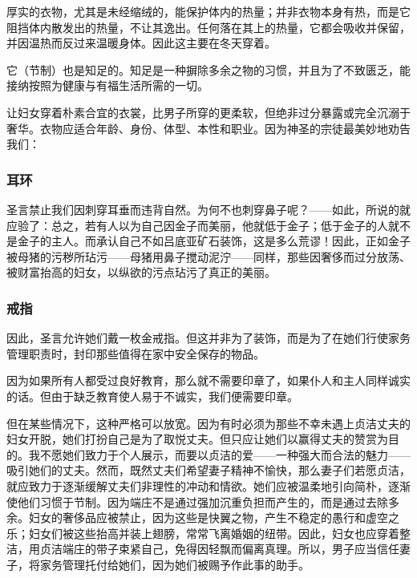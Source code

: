 厚实的衣物，尤其是未经缩绒的，能保护体内的热量；并非衣物本身有热，而是它阻挡体内散发出的热量，不让其逸出。任何落在其上的热量，它都会吸收并保留，并因温热而反过来温暖身体。因此这主要在冬天穿着。\par

它（节制）也是知足的。知足是一种摒除多余之物的习惯，并且为了不致匮乏，能接纳按照为健康与有福生活所需的一切。\par

让妇女穿着朴素合宜的衣裳，比男子所穿的更柔软，但绝非过分暴露或完全沉溺于奢华。衣物应适合年龄、身份、体型、本性和职业。因为神圣的宗徒最美妙地劝告我们：\par


\subsubsection{耳环}

圣言禁止我们因刺穿耳垂而违背自然。为何不也刺穿鼻子呢？——如此，所说的就应验了：总之，若有人以为自己因金子而美丽，他就低于金子；低于金子的人就不是金子的主人。而承认自己不如吕底亚矿石装饰，这是多么荒谬！因此，正如金子被母猪的污秽所玷污——母猪用鼻子搅动泥泞——同样，那些因奢侈而过分放荡、被财富抬高的妇女，以纵欲的污点玷污了真正的美丽。\par


\subsubsection{戒指}

因此，圣言允许她们戴一枚金戒指。但这并非为了装饰，而是为了在她们行使家务管理职责时，封印那些值得在家中安全保存的物品。\par

因为如果所有人都受过良好教育，那么就不需要印章了，如果仆人和主人同样诚实的话。但由于缺乏教育使人易于不诚实，我们便需要印章。\par

但在某些情况下，这种严格可以放宽。因为有时必须为那些不幸未遇上贞洁丈夫的妇女开脱，她们打扮自己是为了取悦丈夫。但只应让她们以赢得丈夫的赞赏为目的。我不愿她们致力于个人展示，而要以贞洁的爱——一种强大而合法的魅力——吸引她们的丈夫。然而，既然丈夫们希望妻子精神不愉快，那么妻子们若愿贞洁，就应致力于逐渐缓解丈夫们非理性的冲动和情欲。她们应被温柔地引向简朴，逐渐使他们习惯于节制。因为端庄不是通过强加沉重负担而产生的，而是通过去除多余。妇女的奢侈品应被禁止，因为这些是快翼之物，产生不稳定的愚行和虚空之乐；妇女们被这些抬高并装上翅膀，常常飞离婚姻的纽带。因此，妇女也应穿着整洁，用贞洁端庄的带子束紧自己，免得因轻飘而偏离真理。所以，男子应当信任妻子，将家务管理托付给她们，因为她们被赐予作此事的助手。\par

